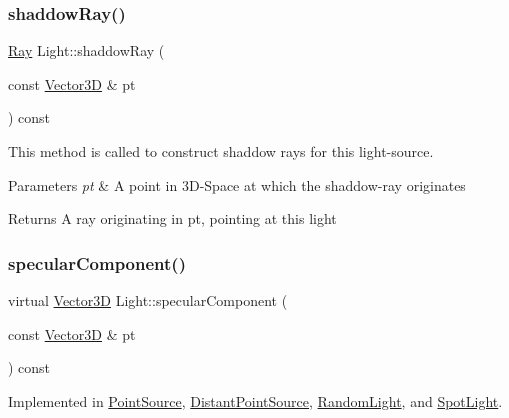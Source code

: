 \mbox{\label{classLight_aa9c1529bb4a52128590e9b52d8a67517}} 
\subsubsection{\texorpdfstring{shaddowRay()}{shaddowRay()}}
{\footnotesize\ttfamily \mbox{\hyperlink{classRay}{Ray}} Light\+::shaddow\+Ray (\begin{DoxyParamCaption}\item[{const \mbox{\hyperlink{classVector3D}{Vector3D}} \&}]{pt }\end{DoxyParamCaption}) const\hspace{0.3cm}{\ttfamily [virtual]}}



This method is called to construct shaddow rays for this light-\/source. 


\begin{DoxyParams}{Parameters}
{\em pt} & A point in 3D-\/\+Space at which the shaddow-\/ray originates \\
\hline
\end{DoxyParams}
\begin{DoxyReturn}{Returns}
A ray originating in pt, pointing at this light 
\end{DoxyReturn}
\mbox{\label{classLight_a2a4cdf8081c2cab02757c2464610a32f}} 
\subsubsection{\texorpdfstring{specularComponent()}{specularComponent()}}
{\footnotesize\ttfamily virtual \mbox{\hyperlink{classVector3D}{Vector3D}} Light\+::specular\+Component (\begin{DoxyParamCaption}\item[{const \mbox{\hyperlink{classVector3D}{Vector3D}} \&}]{pt }\end{DoxyParamCaption}) const\hspace{0.3cm}{\ttfamily [pure virtual]}}



Implemented in \mbox{\hyperlink{classPointSource_a421e0e8d3d1f69aeb095f1f9c39de7e0}{Point\+Source}}, \mbox{\hyperlink{classDistantPointSource_a14f9c55d090d7d3f7999db70f5174a8c}{Distant\+Point\+Source}}, \mbox{\hyperlink{classRandomLight_af9922ba2ce0c9dc16026db945d8f1506}{Random\+Light}}, and \mbox{\hyperlink{classSpotLight_a6a1cc6970bbb3308b5214f85641331cd}{Spot\+Light}}.




